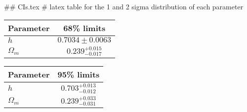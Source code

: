 ## CIs.tex
# latex table for the 1 and 2 sigma distribution of each parameter

\begin{tabular} { l  c}
 Parameter &  68\% limits\\
\hline
{\boldmath$h              $} & $0.7034\pm 0.0063          $\\
{\boldmath$\Omega_m       $} & $0.239^{+0.015}_{-0.017}   $\\
\hline
\end{tabular}

\begin{tabular} { l  c}
 Parameter &  95\% limits\\
\hline
{\boldmath$h              $} & $0.703^{+0.013}_{-0.012}   $\\
{\boldmath$\Omega_m       $} & $0.239^{+0.033}_{-0.031}   $\\
\hline
\end{tabular}
